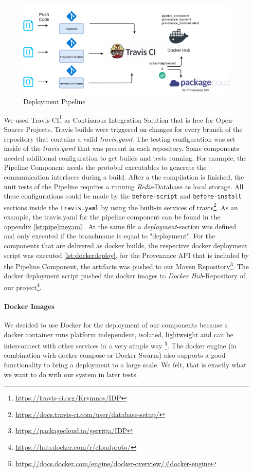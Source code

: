 \begin{figure}[h!]
	\includegraphics[width=\textwidth]{figures/deployment.png}
	\caption{Deployment Pipeline}
	\label{fig:deployment}
\end{figure}


We used Travis CI\footnote{\url{https://travis-ci.org/Krymnos/IDP}} as Continuous Integration Solution that is free for Open-Source Projects. Travis builds were triggered on changes for every branch of the repository that contains a valid \emph{travis.yaml}.
The testing configuration was set inside of the \emph{travis.yaml} that was present in each repository. Some components needed additional configuration to get builds and tests running. For example, the Pipeline Component needs the protobuf executables to generate the communication interfaces during a build. After a the compilation is finished, the unit tests of the Pipeline requires a running \emph{Redis}-Database as local storage. All these configurations could be made by the \texttt{before-script} and \texttt{before-install} sections inside the \texttt{travis.yaml} by using the built-in services of travis\footnote{\url{https://docs.travis-ci.com/user/database-setup/}}. As an example, the travis.yaml for the pipeline component can be found in the appendix \ref{lst:pipelineyaml}.
At the same file a \emph{deployment}-section was defined and only executed if the branchname is equal to "deployment". For the components that are delivered as docker builds, the respective docker deployment script was executed \ref{lst:dockerdeploy}, for the Provenance API that is included by the Pipeline Component, the artifacts was pushed to our Maven Repository\footnote{\url{https://packagecloud.io/gerritja/IDP}}. The docker deployment script pushed the docker images to \emph{Docker Hub}-Repository of our project\footnote{\url{https://hub.docker.com/r/cloudproto/}}.

\paragraph*{Docker Images}
We decided to use Docker for the deployment of our components because a docker container runs platform independent, isolated, lightweight and can be interconnect with other services in a very simple way \footnote{\url{https://docs.docker.com/engine/docker-overview/\#docker-engine}}. The docker engine (in combination wirh docker-compose or Docker Swarm) also supports a good functionality to bring a deployment to a large scale. We felt, that is exactly what we want to do with our system in later tests.

